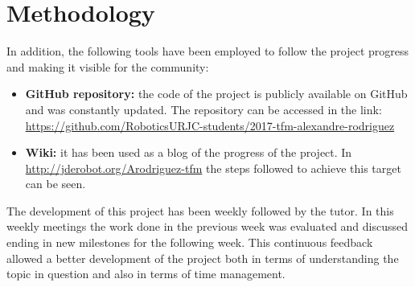\section{Methodology} \label{Methodology}
In addition, the following tools have been employed to follow the project progress and making it visible for the community:
\begin{itemize}
    \item \textbf{GitHub repository:} the code of the project is publicly available on GitHub and was constantly updated. The repository can be accessed in the link: \url{https://github.com/RoboticsURJC-students/2017-tfm-alexandre-rodriguez}
    \item \textbf{Wiki:} it has been used as a blog of the progress of the project. In \url{http://jderobot.org/Arodriguez-tfm} the steps followed to achieve this target can be seen.
\end{itemize}
The development of this project has been weekly followed by the tutor. In this weekly meetings the work done in the previous week was evaluated and discussed ending in new milestones for the following week. This continuous feedback allowed a better development of the project both in terms of understanding the topic in question and also in terms of time management.\\

